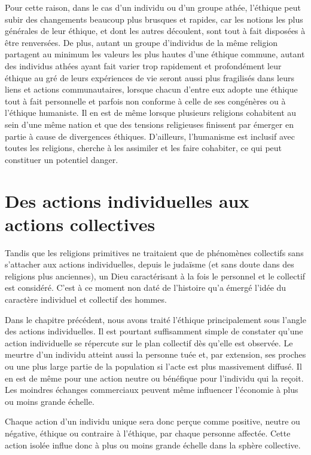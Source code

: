 Pour cette raison, dans le cas d’un individu ou d'un groupe athée, l’éthique peut subir des changements beaucoup plus brusques et rapides, car les notions les plus générales de leur éthique, et dont les autres découlent, sont tout à fait disposées à être renversées. De plus, autant un groupe d’individus de la même religion partagent au minimum les valeurs les plus hautes d’une éthique commune, autant des individus athées ayant fait varier trop rapidement et profondément leur éthique au gré de leurs expériences de vie seront aussi plus fragilisés dans leurs liens et actions communautaires, lorsque chacun d’entre eux adopte une éthique tout à fait personnelle et parfois non conforme à celle de ses congénères ou à l'éthique humaniste. Il en est de même lorsque plusieurs religions cohabitent au sein d'une même nation et que des tensions religieuses finissent par émerger en partie à cause de divergences éthiques. D'ailleurs, l'humanisme est inclusif avec toutes les religions, cherche à les assimiler et les faire cohabiter, ce qui peut constituer un potentiel danger.

\chapter{Des actions individuelles aux actions collectives}

Tandis que les religions primitives ne traitaient que de phénomènes collectifs sans s'attacher aux actions individuelles, depuis le judaïsme (et sans doute dans des religions plus anciennes), un Dieu caractérisant à la fois le personnel et le collectif est considéré. C'est à ce moment non daté de l'histoire qu'a émergé l'idée du caractère individuel et collectif des hommes.

Dans le chapitre précédent, nous avons traité l'éthique principalement sous l'angle des actions individuelles. Il est pourtant suffisamment simple de constater qu’une action individuelle se répercute sur le plan collectif dès qu’elle est observée. Le meurtre d’un individu atteint aussi la personne tuée et, par extension, ses proches ou une plus large partie de la population si l’acte est plus massivement diffusé. Il en est de même pour une action neutre ou bénéfique pour l’individu qui la reçoit. Les moindres échanges commerciaux peuvent même influencer l’économie à plus ou moins grande échelle.

Chaque action d’un individu unique sera donc perçue comme positive, neutre ou négative, éthique ou contraire à l'éthique, par chaque personne affectée. Cette action isolée influe donc à plus ou moins grande échelle dans la sphère collective.

